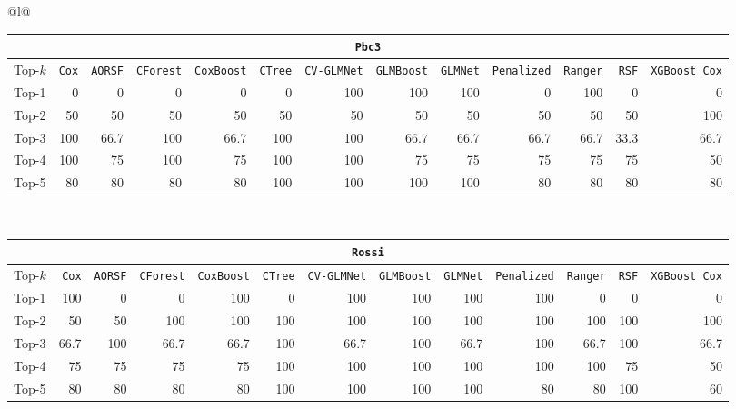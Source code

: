 \begin{longtable}{@{}l@{}}
\begin{tabular}{@{}l*{12}{r}@{}}
\multicolumn{13}{c}{\texttt{Pbc3}} \\
\midrule
Top-$k$ & \texttt{Cox} & \texttt{AORSF} & \texttt{CForest} & \texttt{CoxBoost} & \texttt{CTree} & \texttt{CV-GLMNet} & \texttt{GLMBoost} & \texttt{GLMNet} & \texttt{Penalized} & \texttt{Ranger} & \texttt{RSF} & \texttt{XGBoost Cox} \\
\midrule
Top-1 & 0 & 0 & 0 & 0 & 0 & 100 & 100 & 100 & 0 & 100 & 0 & 0 \\
Top-2 & 50 & 50 & 50 & 50 & 50 & 50 & 50 & 50 & 50 & 50 & 50 & 100 \\
Top-3 & 100 & 66.7 & 100 & 66.7 & 100 & 100 & 66.7 & 66.7 & 66.7 & 66.7 & 33.3 & 66.7 \\
Top-4 & 100 & 75 & 100 & 75 & 100 & 100 & 75 & 75 & 75 & 75 & 75 & 50 \\
Top-5 & 80 & 80 & 80 & 80 & 100 & 100 & 100 & 100 & 80 & 80 & 80 & 80 \\
\end{tabular} \\
\midrule

\begin{tabular}{@{}l*{12}{r}@{}}
\multicolumn{13}{c}{\texttt{Rossi}} \\
\midrule
Top-$k$ & \texttt{Cox} & \texttt{AORSF} & \texttt{CForest} & \texttt{CoxBoost} & \texttt{CTree} & \texttt{CV-GLMNet} & \texttt{GLMBoost} & \texttt{GLMNet} & \texttt{Penalized} & \texttt{Ranger} & \texttt{RSF} & \texttt{XGBoost Cox} \\
\midrule
Top-1 & 100 & 0 & 0 & 100 & 0 & 100 & 100 & 100 & 100 & 0 & 0 & 0 \\
Top-2 & 50 & 50 & 100 & 100 & 100 & 100 & 100 & 100 & 100 & 100 & 100 & 100 \\
Top-3 & 66.7 & 100 & 66.7 & 66.7 & 100 & 66.7 & 100 & 66.7 & 100 & 66.7 & 100 & 66.7 \\
Top-4 & 75 & 75 & 75 & 75 & 100 & 100 & 100 & 100 & 100 & 100 & 75 & 50 \\
Top-5 & 80 & 80 & 80 & 80 & 100 & 100 & 100 & 100 & 80 & 80 & 100 & 60 \\
\end{tabular} \\
\midrule


\end{longtable}
